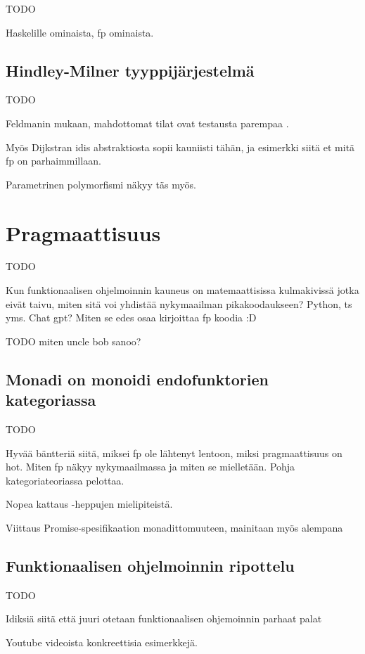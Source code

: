 TODO

Haskelille ominaista, \gls{fp} ominaista.


\subsection{Hindley-Milner tyyppijärjestelmä}

TODO

Feldmanin mukaan, mahdottomat tilat ovat testausta parempaa \cite{impossiblebetter}.

Myös Dijkstran idis abstraktiosta sopii kauniisti tähän, ja esimerkki siitä et mitä \gls{fp} on parhaimmillaan.

Parametrinen polymorfismi näkyy täs myös.

\section{Pragmaattisuus}

TODO

Kun funktionaalisen ohjelmoinnin kauneus on matemaattisissa kulmakivissä jotka eivät taivu, miten sitä voi yhdistää nykymaailman pikakoodaukseen? Python, \gls{ts} yms. Chat gpt? Miten se edes osaa kirjoittaa fp koodia :D

TODO miten uncle bob sanoo? \cite{martin2017pragmaticfp}

\subsection{Monadi on monoidi endofunktorien kategoriassa}

TODO

Hyvää bäntteriä siitä, miksei fp ole lähtenyt lentoon, miksi pragmaattisuus on hot. Miten fp näkyy nykymaailmassa ja miten se mielletään. Pohja kategoriateoriassa pelottaa.

Nopea kattaus  -heppujen mielipiteistä.

Viittaus Promise-spesifikaation monadittomuuteen, mainitaan myös alempana

\subsection{Funktionaalisen ohjelmoinnin ripottelu}

TODO

Idiksiä siitä että juuri otetaan funktionaalisen ohjemoinnin parhaat palat

Youtube videoista konkreettisia esimerkkejä.

